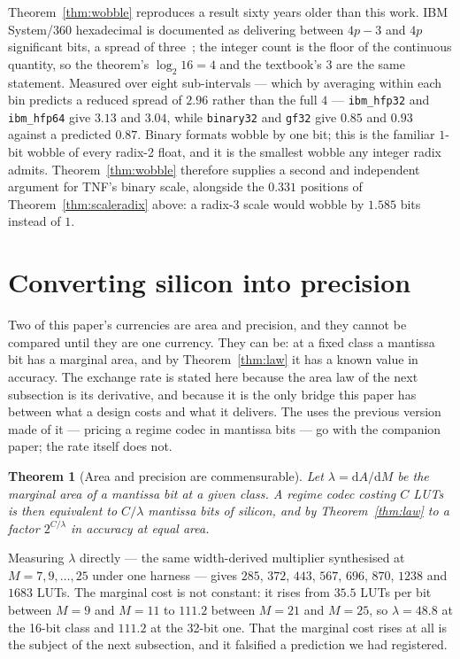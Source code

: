 \documentclass[11pt]{article}
\newtheorem{theorem}{Theorem}
\theoremstyle{definition}
\begin{document}
Theorem~\ref{thm:wobble} reproduces a result sixty years older than this work.
IBM System/360 hexadecimal is documented as delivering between $4p-3$ and $4p$
significant bits, a spread of three~\cite{goldberg1991,ibmhfp}; the integer count
is the floor of the continuous quantity, so the theorem's $\log_2 16 = 4$ and the
textbook's $3$ are the same statement. Measured over eight sub-intervals ---
which by averaging within each bin predicts a reduced spread of $2.96$ rather than
the full $4$ --- \texttt{ibm\_hfp32} and \texttt{ibm\_hfp64} give $3.13$ and
$3.04$, while \texttt{binary32} and \texttt{gf32} give $0.85$ and $0.93$ against a
predicted $0.87$. Binary formats wobble by one bit; this is the familiar
$1$-bit wobble of every radix-2 float, and it is the smallest wobble any integer
radix admits. Theorem~\ref{thm:wobble} therefore supplies a second and independent
argument for TNF's binary scale, alongside the $0.331$ positions of
Theorem~\ref{thm:scaleradix} above: a radix-3 scale would wobble by $1.585$ bits
instead of $1$.

\section{Converting silicon into precision}\label{sec:convert}

Two of this paper's currencies are area and precision, and they cannot be
compared until they are one currency. They can be: at a fixed class a mantissa
bit has a marginal area, and by Theorem~\ref{thm:law} it has a known value in
accuracy. The exchange rate is stated here because the area law of the next
subsection is its derivative, and because it is the only bridge this paper has
between what a design costs and what it delivers. The uses the previous version
made of it --- pricing a regime codec in mantissa bits --- go with the companion
paper; the rate itself does not.

\begin{theorem}[Area and precision are commensurable]
\label{thm:convert}
Let $\lambda = \mathrm{d}A/\mathrm{d}M$ be the marginal area of a mantissa bit at
a given class. A regime codec costing $C$ LUTs is then equivalent to $C/\lambda$
mantissa bits of silicon, and by Theorem~\ref{thm:law} to a factor
$2^{C/\lambda}$ in accuracy at equal area.
\end{theorem}


Measuring $\lambda$ directly --- the same width-derived multiplier synthesised at
$M = 7, 9, \ldots, 25$ under one harness --- gives $285$, $372$, $443$, $567$,
$696$, $870$, $1238$ and $1683$ LUTs. The marginal cost is not constant: it rises
from $35.5$ LUTs per bit between $M{=}9$ and $M{=}11$ to $111.2$ between $M{=}21$
and $M{=}25$, so $\lambda = 48.8$ at the 16-bit class and $111.2$ at the 32-bit
one. That the marginal cost rises at all is the subject of the next subsection,
and it falsified a prediction we had registered.
\end{document}
